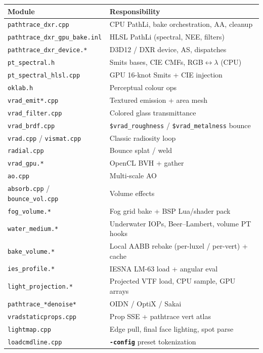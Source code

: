\documentclass[11pt,a4paper]{article}
\newcommand{\flag}[1]{\texttt{\bfseries #1}}
\newcommand{\vmt}[1]{\texttt{\$#1}}
\newcommand{\code}[1]{\texttt{#1}}
\begin{document}
\begin{center}
\small
\begin{tabular}{@{}ll@{}}
  \toprule
  Module & Responsibility \\
  \midrule
  \code{pathtrace\_dxr.cpp} & CPU PathLi, bake orchestration, AA, cleanup \\
  \code{pathtrace\_dxr\_gpu\_bake.inl} & HLSL PathLi (spectral, NEE, filters) \\
  \code{pathtrace\_dxr\_device.*} & D3D12 / DXR device, AS, dispatches \\
  \code{pt\_spectral.h} & Smits bases, CIE CMFs, RGB$\leftrightarrow\lambda$ (CPU) \\
  \code{pt\_spectral\_hlsl.cpp} & GPU 16-knot Smits + CIE injection \\
  \code{oklab.h} & Perceptual colour ops \\
  \code{vrad\_emit*.cpp} & Textured emission + area mesh \\
  \code{vrad\_filter.cpp} & Colored glass transmittance \\
  \code{vrad\_brdf.cpp} & \vmt{vrad\_roughness} / \vmt{vrad\_metalness} bounce \\
  \code{vrad.cpp} / \code{vismat.cpp} & Classic radiosity loop \\
  \code{radial.cpp} & Bounce splat / weld \\
  \code{vrad\_gpu.*} & OpenCL BVH + gather \\
  \code{ao.cpp} & Multi-scale AO \\
  \code{absorb.cpp} / \code{bounce\_vol.cpp} & Volume effects \\
  \code{fog\_volume.*} & Fog grid bake + BSP Lua/shader pack \\
  \code{water\_medium.*} & Underwater IOPs, Beer--Lambert, volume PT hooks \\
  \code{bake\_volume.*} & Local AABB rebake (per-luxel / per-vert) + cache \\
  \code{ies\_profile.*} & IESNA LM-63 load + angular eval \\
  \code{light\_projection.*} & Projected VTF load, CPU sample, GPU arrays \\
  \code{pathtrace\_*denoise*} & OIDN / OptiX / Sakai \\
  \code{vradstaticprops.cpp} & Prop SSE + pathtrace vert atlas \\
  \code{lightmap.cpp} & Edge pull, final face lighting, spot parse \\
  \code{loadcmdline.cpp} & \flag{-config} preset tokenization \\
  \bottomrule
\end{tabular}
\end{center}
\end{document}
